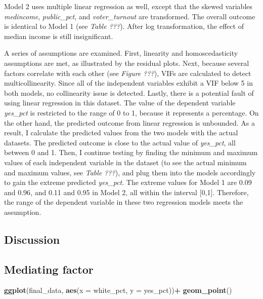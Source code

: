 \documentclass[
]{article}
\newenvironment{Shaded}{\begin{snugshade}}{\end{snugshade}}
\newcommand{\DataTypeTok}[1]{\textcolor[rgb]{0.13,0.29,0.53}{#1}}
\newcommand{\KeywordTok}[1]{\textcolor[rgb]{0.13,0.29,0.53}{\textbf{#1}}}
\newcommand{\NormalTok}[1]{#1}
\newcommand{\OperatorTok}[1]{\textcolor[rgb]{0.81,0.36,0.00}{\textbf{#1}}}
\newcommand{\StringTok}[1]{\textcolor[rgb]{0.31,0.60,0.02}{#1}}
\begin{document}
Model 2 uses multiple linear regression as well, except that the skewed
variables \emph{medincome}, \emph{public\_pct}, and
\emph{voter\_turnout} are transformed. The overall outcome is identical
to Model 1 (see \emph{Table ???}). After log transformation, the effect
of median income is still insignificant.

A series of assumptions are examined. First, linearity and
homoscedasticity assumptions are met, as illustrated by the residual
plots. Next, because several factors correlate with each other (see
\emph{Figure ???}), VIFs are calculated to detect multicollinearity.
Since all of the independent variables exhibit a VIF below 5 in both
models, no collinearity issue is detected. Lastly, there is a potential
fault of using linear regression in this dataset. The value of the
dependent variable \emph{yes\_pct} is restricted to the range of 0 to 1,
because it represents a percentage. On the other hand, the predicted
outcome from linear regression is unbounded. As a result, I calculate
the predicted values from the two models with the actual datasets. The
predicted outcome is close to the actual value of \emph{yes\_pct}, all
between 0 and 1. Then, I continue testing by finding the minimum and
maximum values of each independent variable in the dataset (to see the
actual minimum and maximum values, see \emph{Table ???}), and plug them
into the models accordingly to gain the extreme predicted
\emph{yes\_pct}. The extreme values for Model 1 are 0.09 and 0.96, and
0.11 and 0.95 in Model 2, all within the interval {[}0,1{]}. Therefore,
the range of the dependent variable in these two regression models meets
the assumption.

\hypertarget{discussion}{%
\subsection{Discussion}\label{discussion}}

\hypertarget{mediating-factor}{%
\subsection{Mediating factor}\label{mediating-factor}}

\begin{Shaded}
\begin{Highlighting}[]
\KeywordTok{ggplot}\NormalTok{(final_data, }\KeywordTok{aes}\NormalTok{(}\DataTypeTok{x =}\NormalTok{ white_pct, }\DataTypeTok{y =}\NormalTok{ yes_pct))}\OperatorTok{+}
\StringTok{   }\KeywordTok{geom_point}\NormalTok{()}
\end{Highlighting}
\end{Shaded}
\end{document}
